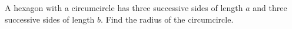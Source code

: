 A hexagon with a circumcircle has three successive sides of length $a$ and three successive sides of length $b$. Find the radius of the circumcircle.
